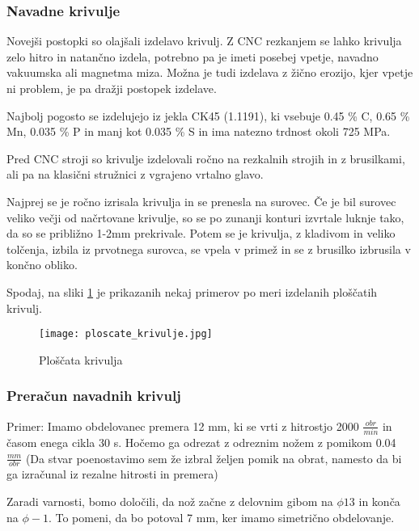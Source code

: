 \subsubsection{Navadne krivulje}
Novejši postopki so olajšali izdelavo krivulj. Z CNC rezkanjem se
lahko krivulja zelo hitro in natančno izdela, potrebno pa je
imeti posebej vpetje, navadno vakuumska ali magnetma miza. Možna je
tudi izdelava z žično erozijo, kjer vpetje ni problem, je pa dražji
postopek izdelave.

Najbolj pogosto se izdelujejo iz jekla CK45 (1.1191), ki vsebuje
0.45 \% C, 0.65 \% Mn, 0.035 \% P in manj kot 0.035 \% S in ima natezno trdnost okoli 725 MPa.

Pred CNC stroji so krivulje izdelovali ročno na rezkalnih strojih
in z brusilkami, ali pa na klasični stružnici z vgrajeno vrtalno glavo.

Najprej se je ročno izrisala krivulja in se prenesla na surovec.
Če je bil surovec veliko večji od načrtovane krivulje, so se po
zunanji konturi izvrtale luknje tako, da so se približno 1-2mm
prekrivale. Potem se je krivulja, z kladivom in veliko tolčenja, izbila iz prvotnega surovca,
se vpela v primež in se z brusilko izbrusila v končno obliko.

Spodaj, na sliki \ref{ploscate_krivulje} je prikazanih nekaj primerov
po meri izdelanih ploščatih krivulj.

\begin{figure}[H]
	\begin{center}
		\texttt{[image: ploscate\_krivulje.jpg]}
		\caption{Ploščata krivulja
			\cite{lasten}}
		\label{ploscate_krivulje}
	\end{center}
\end{figure}

\subsubsection{Preračun navadnih krivulj}
\label{izracun_krivulj}
Primer: Imamo obdelovanec premera 12 mm, ki se vrti z hitrostjo 2000 \( \frac{obr}{min} \)
in časom enega cikla 30 s. Hočemo ga odrezat z odreznim nožem z pomikom 0.04 \( \frac{mm}{obr} \)
(Da stvar poenostavimo sem že izbral željen pomik na obrat, namesto da bi ga
izračunal iz rezalne hitrosti in premera)

Zaradi varnosti, bomo določili, da nož začne z delovnim gibom
na $\phi13$ in konča na $\phi-1$. To pomeni, da bo potoval 7 mm, ker
imamo simetrično obdelovanje.

